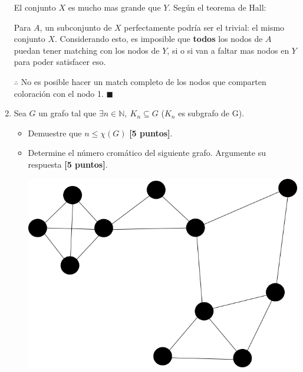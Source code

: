 \documentclass[legalpaper,10pt]{article}
\begin{document}
\begin{enumerate}[1)]
El conjunto \(X\) es mucho mas grande que \(Y\). Según el teorema de Hall:

\begin{center}
\end{center}

Para \(A\), un subconjunto de \(X\) perfectamente podría ser el trivial: el mismo conjunto \(X\). Considerando esto, es imposible que \textbf{todos} los nodos de \(A\) puedan tener matching con los nodos de \(Y\), si o si van a faltar mas nodos en \(Y\) para poder satisfacer eso.

\(\therefore\) No es posible hacer un match completo de los nodos que comparten coloración con el nodo 1. \hfill \(\blacksquare\)




\newpage






\item Sea \(G\) un grafo tal que \(\exists n \in \mathbb N,\ K_n \subseteq G\) (\(K_n\) es subgrafo de G).
  \begin{itemize}
    \item Demuestre que \( n \leq \chi (G) \) \textbf{[5 puntos]}.
    \item Determine el número cromático del siguiente grafo. Argumente su respuesta \textbf{[5 puntos]}.
      \begin{center}
        \includegraphics[scale=0.3]{./cline.png}
      \end{center}
  \end{itemize}


\end{enumerate}
\end{document}
